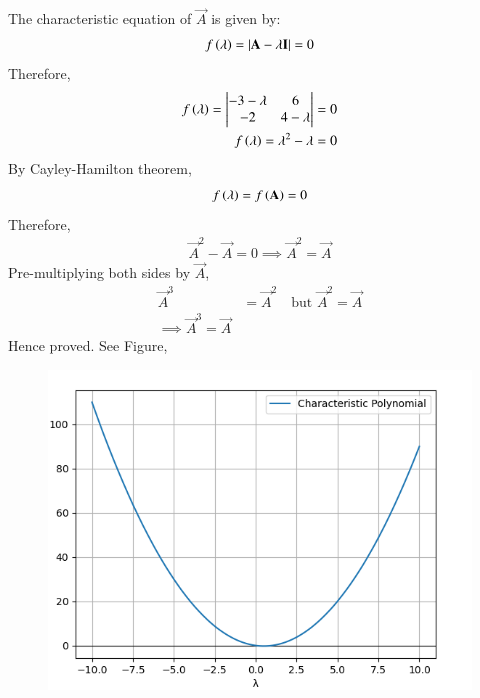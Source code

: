 \documentclass[journal]{IEEEtran}
\begin{document}
The characteristic equation of $\vec{A}$ is given by:
\begin{align}
    f\left(\lambda\right) = \lvert\mathbf{A}-\lambda\mathbf{I}\rvert =0
\end{align}
Therefore,
\begin{align}
    f\left(\lambda\right) = \begin{vmatrix}-3-\lambda & 6 \\ -2 & 4-\lambda\end{vmatrix} =0\\
    f\left(\lambda\right)=\lambda^2 -\lambda =0    
\end{align}
By Cayley-Hamilton theorem,
\begin{align}
    f\left(\lambda\right) = f\left(\mathbf{A}\right) =0
\end{align}
Therefore,
\begin{align}
    \vec{A}^2 - \vec{A} =0
    \implies \vec{A}^2 = \vec{A}
\end{align}
Pre-multiplying both sides by $\vec{A}$,
\begin{align}
    \vec{A}^3 &= \vec{A}^2\quad\text{but $\vec{A}^2 = \vec{A}$}\\
    \implies \vec{A}^3 = \vec{A}
\end{align}
Hence proved.
\newpage
See Figure,
\begin{figure}[h!]
    \centering
    \includegraphics[height=0.5\textheight, keepaspectratio]{figs/fig.png}
    \label{figure_1}
\end{figure}
\end{document}
